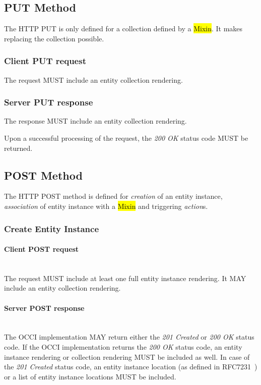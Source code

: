 \documentclass[10pt,a4paper]{article}
\begin{document}
\subsection{PUT Method}
The HTTP PUT is only defined for a collection defined by a \hl{Mixin}. It makes replacing the collection possible.

\subsubsection*{Client PUT request}
The request MUST include an entity collection rendering.

\subsubsection*{Server PUT response}
The response MUST include an entity collection rendering.

Upon a successful processing of the request, the \emph{200 OK} status code MUST be returned.

\subsection{POST Method}
The HTTP POST method is defined for {\em creation} of an entity instance, {\em association}
of entity instance with a \hl{Mixin} and triggering {\em action}s.

\subsubsection{Create Entity Instance}

\paragraph*{Client POST request}\hfill\\
The request MUST include at least one full entity instance rendering.
It MAY include an entity collection rendering.

\paragraph*{Server POST response}\hfill\\
The OCCI implementation MAY return either the \emph{201 Created} or \emph{200 OK} status code. If the OCCI implementation
returns the \emph{200 OK} status code, an entity instance rendering or collection rendering MUST be included as well.
In case of the \emph{201 Created} status code, an entity instance location (as defined in RFC7231~\cite{rfc7231})
or a list of entity instance locations MUST be included.
\end{document}
